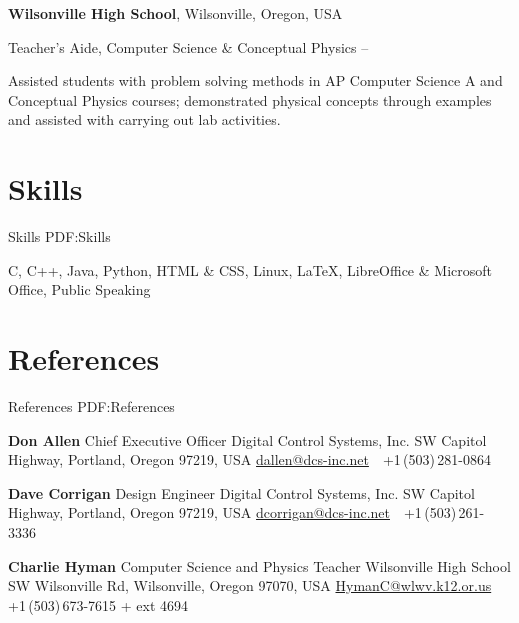 \documentclass[letterpaper,MMMyyyy,nonstop]{simpleresumecv}
\newcommand{\CVNote}{}
\begin{document}
\begin{body}
\textbf{Wilsonville High School},
Wilsonville, Oregon, USA

\GapNoBreak
\BulletItem
Teacher's Aide,
Computer Science \& Conceptual Physics
\hfill
{} --
\begin{detail}
\SubBulletItem
Assisted students with problem solving methods in AP Computer Science A and Conceptual Physics courses; demonstrated physical concepts through examples and assisted with carrying out lab activities.
\end{detail}


\section
{Skills}
{Skills}
{PDF:Skills}

C,
C++,
Java,
Python,
HTML \& CSS,
Linux,
{\LaTeX},
LibreOffice \& Microsoft Office,
Public Speaking


\section
{References}
{References}
{PDF:References}

\Gap
\BulletItem
\textbf{Don Allen}
\newline
Chief Executive Officer
\newline
Digital Control Systems, Inc.
 SW Capitol Highway, 
Portland, Oregon 97219, USA
\newline
\href{mailto:dallen@dcs-inc.net}
{dallen@dcs-inc.net}
\,\SubBulletSymbol\,
+1\,(503)\,281-0864

\BigGap
\BulletItem
\textbf{Dave Corrigan}
\newline
Design Engineer
\newline
Digital Control Systems, Inc.
 SW Capitol Highway, 
Portland, Oregon 97219, USA
\newline
\href{mailto:dcorrigan@dcs-inc.net}
{dcorrigan@dcs-inc.net}
\,\SubBulletSymbol\,
+1\,(503)\,261-3336

\BigGap
\BulletItem
\textbf{Charlie Hyman}
\newline
Computer Science and Physics Teacher 
\newline
Wilsonville High School
 SW Wilsonville Rd, 
Wilsonville, Oregon 97070, USA
\newline
\href{mailto:HymanC@wlwv.k12.or.us}
{HymanC@wlwv.k12.or.us}
\,\SubBulletSymbol\,
+1\,(503)\,673-7615 + ext 4694

\end{body}


\iffalse

\UseNoteFont%
\null\hfill%
[\textit{\CVNote}]%
\hspace{2.0mm}\null

\fi
\end{document}
